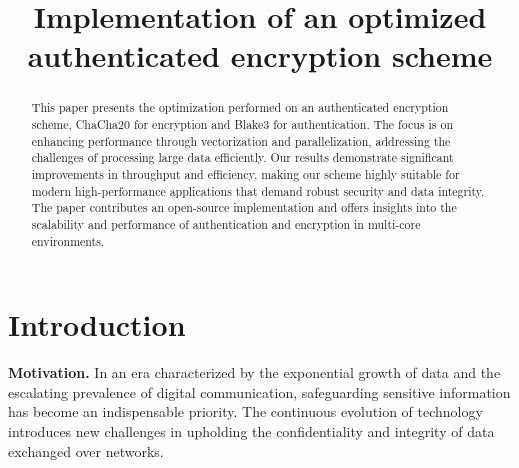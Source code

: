 \documentclass[letterpaper]{article}
\title{Implementation of an optimized authenticated encryption scheme}
\newcommand{\mypar}[1]{{\bf #1.}}
\begin{document}
%
\maketitle
%


\begin{abstract}
	This paper presents the optimization performed on an authenticated encryption scheme, ChaCha20 for encryption and Blake3 for authentication. The focus is on enhancing performance through vectorization and parallelization, addressing the challenges of processing large data efficiently. Our results demonstrate significant improvements in throughput and efficiency, making our scheme highly suitable for modern high-performance applications that demand robust security and data integrity. The paper contributes an open-source implementation and offers insights into the scalability and performance of authentication and encryption in multi-core environments.
\end{abstract}

\section{Introduction}\label{sec:intro}


\mypar{Motivation}
%
%
In an era characterized by the exponential growth of data and the escalating prevalence of digital communication, safeguarding sensitive information has become an indispensable priority. The continuous evolution of technology introduces new challenges in upholding the confidentiality and integrity of data exchanged over networks.
\end{document}

